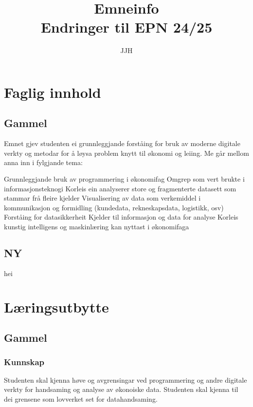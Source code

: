 \documentclass[12pt, titlepage]{article}
\begin{document}
\title{Emneinfo \\ Endringer til EPN 24/25}
\author{JJH}
\date{}
\maketitle


\section*{Faglig innhold}

\subsection*{Gammel}
Emnet gjev studenten ei grunnleggjande forståing for bruk av moderne digitale verkty og metodar for å løysa problem knytt til økonomi og leiing.  Me går mellom anna inn i fylgjande tema:

    Grunnleggjande bruk av programmering i økonomifag
    Omgrep som vert brukte i informasjonsteknogi
    Korleis ein analyserer store og fragmenterte datasett som stammar frå fleire kjelder
    Visualisering av data som verkemiddel i kommunikasjon og formidling (kundedata, rekneskapsdata, logistikk, osv)
    Forståing for datasikkerheit
    Kjelder til informasjon og data for analyse
    Korleis kunstig intelligens og maskinlæring kan nyttast i økonomifaga

\subsection*{NY}

hei

\section*{Læringsutbytte}
\subsection*{Gammel}

\subsubsection*{Kunnskap}

    Studenten skal kjenna høve og avgrensingar ved programmering og andre digitale verkty for handsaming og analyse av økonoiske data.
    Studenten skal kjenna til dei grensene som lovverket set for datahandsaming.
\end{document}

